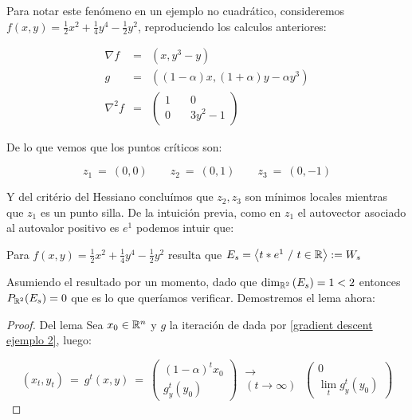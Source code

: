 \begin{example}
	
	Para notar este fen\'omeno en un ejemplo no cuadr\'atico, consideremos $f(x, y) = \frac{1}{2}x^2 + \frac{1}{4}y^4 - \frac{1}{2}y^2$, reproduciendo los calculos anteriores:
	
	\label{gradient descent ejemplo 2}
	\begin{equation}
	\begin{aligned}
	\nabla f & = & \left(x, y^3 -y\right) \\
	g & = & \left((1-\alpha)x, (1+\alpha)y - \alpha y^3\right) \\
	\nabla^2 f & = & \left(
	\begin{aligned}
	1 & \quad 0 \\
	0 & \quad 3y^2-1
	\end{aligned}
	\right) 
	\end{aligned}
	\end{equation}
	
	De lo que vemos que los puntos cr\'iticos son:
	
	\[
	z_1 \ = \ (0,0) \qquad z_2 \ = \ (0,1) \qquad z_3 \ = \ (0,-1)
	\]
	
	Y del crit\'erio del Hessiano conclu\'imos que $z_2, z_3$ son m\'inimos locales mientras que $z_1$ es un punto silla. De la intuici\'on previa, como en $z_1$ el autovector asociado al autovalor positivo es $e^1$ podemos intuir que:
	
	\begin{lemma}
		Para $f(x, y) = \frac{1}{2}x^2 + \frac{1}{4}y^4 - \frac{1}{2}y^2$ resulta que $E_s = \left\langle t*e^1 \ / \ t \in {\mathbb{R}}\right\rangle:= W_s$
	\end{lemma}
	
	Asumiendo el resultado por un momento, dado que $\dim_{{\mathbb{R}}^2}\left(E_s\right) =1 < 2$ entonces $P_{{\mathbb{R}}^2}(E_s) = 0$ que es lo que quer\'iamos verificar. Demostremos el lema ahora:
	
	\begin{proof}{Del lema}
		Sea $x_0 \in {\mathbb{R}}^n$ y $g$ la iteraci\'on de \dg dada por \ref{gradient descent ejemplo 2}, luego:
		
		\begin{equation*}
		(x_t, y_t) \ = \ g^t(x,y) \ = \ \left(\begin{aligned}
		(1-\alpha)^tx_0 \\
		g_y^t(y_0)
		\end{aligned}\right) \ \substack{\longrightarrow \\ \left(t \rightarrow \infty\right)} \ \left(\begin{aligned}
		0 \\
		\lim\limits_t g_y^t(y_0)
		\end{aligned}\right)
		\end{equation*}
		

\end{proof}
\end{example}
